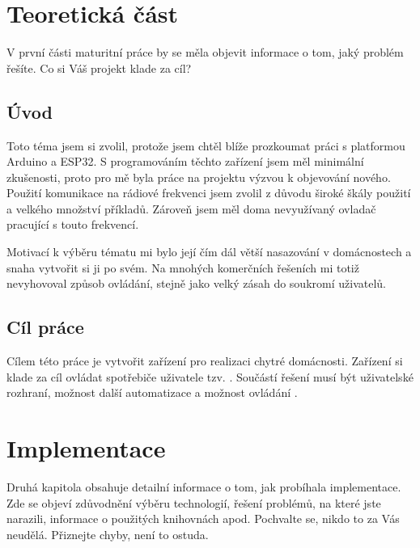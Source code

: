 \documentclass[11pt,a4paper,twoside,openright]{report}
\begin{document}


\setcounter{tocdepth}{2}
\tableofcontents

\chapter{Teoretická část}
\pagestyle{fancy}

V první části maturitní práce by se měla objevit informace o tom, jaký problém řešíte. Co si Váš projekt klade za cíl?

\section{Úvod}

Toto téma jsem si zvolil, protože jsem chtěl blíže prozkoumat práci s platformou Arduino a ESP32. S programováním těchto zařízení jsem měl minimální zkušenosti, proto pro mě byla práce na projektu výzvou k objevování nového. Použití komunikace na rádiové frekvenci jsem zvolil z důvodu široké škály použití a velkého množství příkladů. Zároveň jsem měl doma nevyužívaný ovladač pracující s touto frekvencí.



Motivací k výběru tématu  mi bylo její čím dál větší nasazování v domácnostech a snaha vytvořit si ji po svém. Na mnohých komerčních řešeních mi totiž nevyhovoval způsob ovládání, stejně jako velký zásah do soukromí uživatelů.


\section{Cíl práce}

Cílem této práce je vytvořit zařízení pro realizaci chytré domácnosti. Zařízení si klade za cíl ovládat spotřebiče uživatele tzv. . Součástí řešení musí být uživatelské rozhraní, možnost další automatizace a možnost ovládání .


\chapter{Implementace}

Druhá kapitola obsahuje detailní informace o tom, jak probíhala implementace. Zde se objeví zdůvodnění výběru technologií, řešení problémů, na které jste narazili, informace o použitých knihovnách apod. Pochvalte se, nikdo to za Vás neudělá. Přiznejte chyby, není to ostuda.
\end{document}
